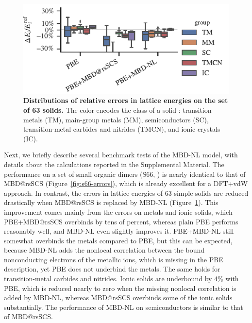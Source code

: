 \begin{figure}[t!]
\centering
\includegraphics{../media/solids-errors.pdf}
\caption{\textbf{Distributions of relative errors in lattice energies on the set of 63 solids.}
The color encodes the class of a solid \citep{ZhangNJP18}: transition metals (TM), main-group metals (MM), semiconductors (SC), transition-metal carbides and nitrides (TMCN), and ionic crystals (IC).
}\label{fig:solids-errors}
\end{figure}

Next, we briefly describe several benchmark tests of the MBD-NL model, with details about the calculations reported in the Supplemental Material.
The performance on a set of small organic dimers (S66, \citealp{RezacJCTC11}) is nearly identical to that of MBD@rsSCS (Figure~\ref{fig:s66-errors}), which is already excellent for a DFT+vdW approach.
In contrast, the errors in lattice energies of 63 simple solids \citep{ZhangNJP18} are reduced drastically when MBD@rsSCS is replaced by MBD-NL (Figure~\ref{fig:solids-errors}).
This improvement comes mainly from the errors on metals and ionic solids, which PBE+MBD@rsSCS overbinds by tens of percent, whereas plain PBE performs reasonably well, and MBD-NL even slightly improves it.
PBE+MBD-NL still somewhat overbinds the metals compared to PBE, but this can be expected, because MBD-NL adds the nonlocal correlation between the bound nonconducting electrons of the metallic ions, which is missing in the PBE description, yet PBE does not underbind the metals.
The same holds for transition-metal carbides and nitrides.
Ionic solids are underbound by 4\% with PBE, which is reduced nearly to zero when the missing nonlocal correlation is added by MBD-NL, whereas MBD@rsSCS overbinds some of the ionic solids substantially.
The performance of MBD-NL on semiconductors is similar to that of MBD@rsSCS\@.

